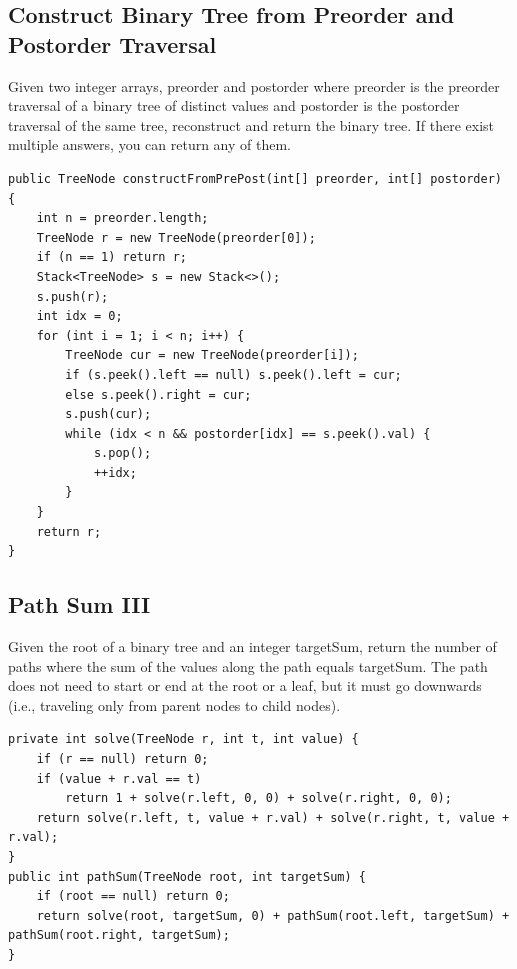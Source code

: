 \documentclass[9pt, b5paper]{article}
\begin{document}
\subsection{Construct Binary Tree from Preorder and Postorder Traversal}
\label{sec-17-3}
Given two integer arrays, preorder and postorder where preorder is the preorder traversal of a binary tree of distinct values and postorder is the postorder traversal of the same tree, reconstruct and return the binary tree.
If there exist multiple answers, you can return any of them.
\begin{verbatim}
public TreeNode constructFromPrePost(int[] preorder, int[] postorder) {
    int n = preorder.length;
    TreeNode r = new TreeNode(preorder[0]);
    if (n == 1) return r;
    Stack<TreeNode> s = new Stack<>();
    s.push(r);
    int idx = 0;
    for (int i = 1; i < n; i++) {
        TreeNode cur = new TreeNode(preorder[i]);
        if (s.peek().left == null) s.peek().left = cur;
        else s.peek().right = cur;
        s.push(cur);
        while (idx < n && postorder[idx] == s.peek().val) {
            s.pop();
            ++idx;
        }
    }
    return r;
}
\end{verbatim}

\subsection{Path Sum III}
\label{sec-17-4}
Given the root of a binary tree and an integer targetSum, return the number of paths where the sum of the values along the path equals targetSum.
The path does not need to start or end at the root or a leaf, but it must go downwards (i.e., traveling only from parent nodes to child nodes).
\begin{verbatim}
private int solve(TreeNode r, int t, int value) {
    if (r == null) return 0;
    if (value + r.val == t)
        return 1 + solve(r.left, 0, 0) + solve(r.right, 0, 0);
    return solve(r.left, t, value + r.val) + solve(r.right, t, value + r.val);
}
public int pathSum(TreeNode root, int targetSum) {
    if (root == null) return 0;
    return solve(root, targetSum, 0) + pathSum(root.left, targetSum) + pathSum(root.right, targetSum);
}
\end{verbatim}
\end{document}
